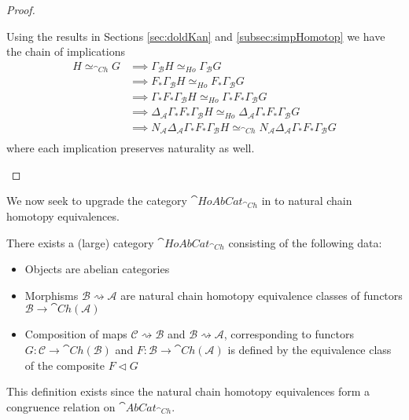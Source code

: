 \begin{proof}
\begin{itemize}
\begin{equation*}
        \end{equation*}
        Using the results in Sections \ref{sec:doldKan} and \ref{subsec:simpHomotop} we have the chain of implications
        \begin{align*}
            H \simeq_{\cat{Ch}}G &\implies \Gamma_\mathcal{B}H \simeq_{Ho} \Gamma_\mathcal{B}G \\
            &\implies F_*\Gamma_\mathcal{B}H \simeq_{Ho} F_*\Gamma_\mathcal{B}G \\
            &\implies \Gamma_*F_*\Gamma_\mathcal{B}H \simeq_{Ho} \Gamma_*F_*\Gamma_\mathcal{B}G \\
            &\implies \Delta_\mathcal{A}\Gamma_*F_*\Gamma_\mathcal{B}H \simeq_{Ho} \Delta_\mathcal{A}\Gamma_*F_*\Gamma_\mathcal{B}G \\
            &\implies N_\mathcal{A}\Delta_\mathcal{A}\Gamma_*F_*\Gamma_\mathcal{B}H \simeq_{\cat{Ch}} N_\mathcal{A}\Delta_\mathcal{A}\Gamma_*F_*\Gamma_\mathcal{B}G \\
        \end{align*}
        where each implication preserves naturality as well.
    \end{itemize}
\end{proof}


We now seek to upgrade the category $\cat{HoAbCat}_{\cat{Ch}}$ in \cite{BJORT} to natural chain homotopy equivalences.

\begin{defn}[label=defn:HoAbCat]{}
    There exists a (large) category $\cat{HoAbCat}_{\cat{Ch}}$ consisting of the following data:
    \begin{itemize}
        \item Objects are abelian categories
        \item Morphisms $\mathcal{B}\rightsquigarrow \mathcal{A}$ are natural chain homotopy equivalence classes of functors $\mathcal{B}\rightarrow \cat{Ch}(\mathcal{A})$
        \item Composition of maps $\mathcal{C}\rightsquigarrow \mathcal{B}$ and $\mathcal{B}\rightsquigarrow \mathcal{A}$, corresponding to functors $G:\mathcal{C}\rightarrow \cat{Ch}(\mathcal{B})$ and $F:\mathcal{B}\rightarrow \cat{Ch}(\mathcal{A})$ is defined by the equivalence class of the composite $F\lhd G$
    \end{itemize}
\end{defn}

This definition exists since the natural chain homotopy equivalences form a congruence relation on $\cat{AbCat}_{\cat{Ch}}$.

